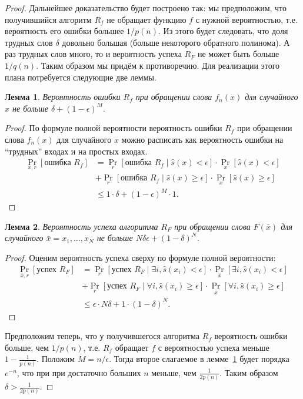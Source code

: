 \documentclass[12pt,a4paper]{article}
\theoremstyle{definition}
\theoremstyle{plain}
\newtheorem{lemma}{Лемма}[section]
\theoremstyle{remark}
\begin{document}
\begin{proof}
Дальнейшее доказательство будет построено так: мы предположим, что получившийся алгоритм $R_f$ 
не обращает функцию $f$ с нужной вероятностью, т.е. вероятность его ошибки большее $1/p(n)$.
Из этого будет следовать, что доля трудных слов $\delta$ довольно большая 
(больше некоторого обратного полинома). А раз трудных слов много, то и вероятность успеха 
$R_F$ не может быть больше $1/q(n)$. Таким образом мы придём к противоречию.
Для реализации этого плана потребуется следующие две леммы.
\begin{lemma}\label{lm:owf:rf}
Вероятность ошибки $R_f$ при обращении слова $f_n(x)$ 
для случайного $x$ не больше $\delta + (1 - \epsilon)^M.$
\end{lemma}
\begin{proof}
По формуле полной вероятности вероятность ошибки $R_f$ 
при обращении слова $f_n(x)$ для случайного $x$ можно расписать
как вероятность ошибки на ``трудных'' входах и на простых входах.
$$\begin{aligned}
\Pr_{x,r}[\text{ошибка $R_f$}] 
&= \Pr_r[\text{ошибка $R_f$}\mid \hat s(x) <   \epsilon] \cdot \Pr_x[\hat s(x) <   \epsilon]\\ 
&+ \Pr_r[\text{ошибка $R_f$}\mid \hat s(x) \ge \epsilon] \cdot \Pr_x[\hat s(x) \ge \epsilon]\\
&\le 1 \cdot \delta + (1 - \epsilon)^M \cdot 1.
\end{aligned}
$$
\end{proof}

\begin{lemma}\label{lm:owf:rfn}
Вероятность успеха алгоритма $R_F$ при обращении слова $F(\bar x)$ 
для случайного $\bar x = x_1,\dotsc,x_N$ не больше $N\delta\epsilon + (1 - \delta)^N$.
\end{lemma}
\begin{proof}
Оценим вероятность успеха сверху по формуле полной вероятности:
$$\begin{aligned}
\Pr_{\bar x,r}[\text{успех $R_F$}] 
&= \Pr_r[\text{успех $R_F$}\mid \exists i, \hat s(x_i) <   \epsilon] \cdot \Pr_{\bar x}[\exists i, \hat s(x_i) < \epsilon]\\
&+ \Pr_r[\text{успех $R_F$}\mid \forall i, \hat s(x_i) \ge \epsilon] \cdot \Pr_{\bar x}[\forall i, \hat s(x_i) \ge \epsilon]\\
&\le \epsilon \cdot N\delta + 1 \cdot (1 - \delta)^N.
\end{aligned}
$$
\end{proof}

Предположим теперь, что у получившегося алгоритма $R_f$ вероятность ошибки больше, чем $1/p(n)$, 
т.е. $R_f$ обращает $f$ с вероятностью успеха меньше $1-\frac{1}{p(n)}$. Положим $M = n / \epsilon$. 
Тогда второе слагаемое в лемме~\ref{lm:owf:rf} будет порядка $e^{-n}$, что при
при достаточно больших $n$ меньше, чем $\frac{1}{2p(n)}$.  Таким образом
$\delta > \frac{1}{2p(n)}$.


\end{proof}
\end{document}
